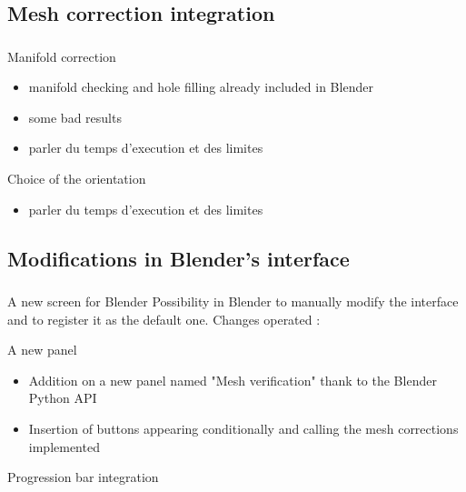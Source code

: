 \documentclass{beamer}
\begin{document}
\subsection{Mesh correction integration}
\begin{frame}
	\frametitle{}

    \begin{block}{Manifold correction}
		\begin{itemize}
			\item manifold checking and hole filling already included in Blender
			\item some bad results
			\item parler du temps d'execution et des limites
		\end{itemize}
    \end{block}
    
    \begin{block}{Choice of the orientation}
		\begin{itemize}
			\item parler du temps d'execution et des limites
		\end{itemize}
    \end{block}
    
\end{frame}

\subsection{Modifications in Blender's interface}
\begin{frame}
	\frametitle{}

    \begin{block}{A new screen for Blender}
Possibility in Blender to manually modify the interface and to register it as the default one.
Changes operated :
    \end{block}
    
    \begin{block}{A new panel}
    \begin{itemize}
	\item Addition on a new panel named "Mesh verification" thank to the Blender Python API
	\item Insertion of buttons appearing conditionally and calling the mesh corrections implemented
	\end{itemize}
    \end{block}
    
    \begin{block}{Progression bar integration}

    \end{block}
    
\end{frame}
\end{document}
